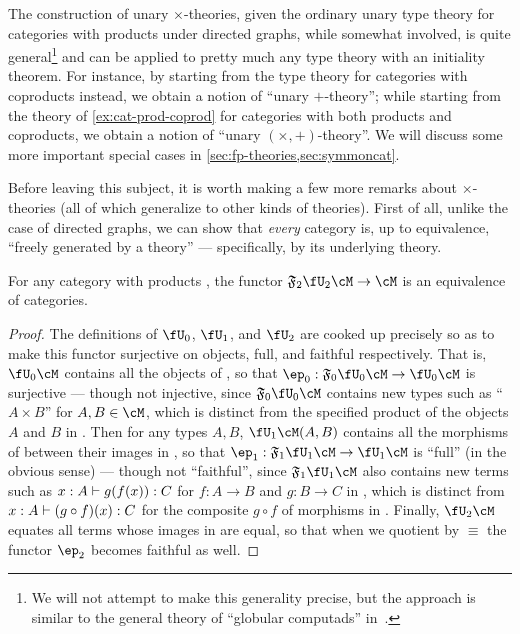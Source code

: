 The construction of unary $\times$-theories, given the ordinary unary type theory for categories with products under directed graphs, while somewhat involved, is quite general\footnote{We will not attempt to make this generality precise, but the approach is similar to the general theory of ``globular computads'' in~\cite{batanin:cptd-fin}.} and can be applied to pretty much any type theory with an initiality theorem.
For instance, by starting from the type theory for categories with coproducts instead, we obtain a notion of ``unary $+$-theory''; while starting from the theory of \cref{ex:cat-prod-coprod} for categories with both products and coproducts, we obtain a notion of ``unary $(\times,+)$-theory''.
We will discuss some more important special cases in \cref{sec:fp-theories,sec:symmoncat}.

Before leaving this subject, it is worth making a few more remarks about $\times$-theories (all of which generalize to other kinds of theories).
First of all, unlike the case of directed graphs, we can show that \emph{every} category is, up to equivalence, ``freely generated by a theory'' --- specifically, by its underlying theory.

\begin{thm}\label{thm:catprod-thy-esssurj}
  For any category with products \cM, the functor $\F2\fU_2\cM \to \cM$ is an equivalence of categories.
\end{thm}
\begin{proof}
  The definitions of $\fU_0$, $\fU_1$, and $\fU_2$ are cooked up precisely so as to make this functor surjective on objects, full, and faithful respectively.
  That is, $\fU_0\cM$ contains all the objects of \cM, so that $\ep_0:\F{0}\fU_0\cM\to \fU_0\cM$ is surjective --- though not injective, since $\F{0}\fU_0\cM$ contains new types such as ``$A\times B$'' for $A,B\in \cM$, which is distinct from the specified product of the objects $A$ and $B$ in \cM.
  Then for any types $A,B$, $\fU_1\cM(A,B)$ contains all the morphisms of \cM between their images in \cM, so that $\ep_1:\F{1}\fU_1\cM\to \fU_1\cM$ is ``full'' (in the obvious sense) --- though not ``faithful'', since $\F{1}\fU_1\cM$ also contains new terms such as $x:A\vdash g(f(x)):C$ for $f:A\to B$ and $g:B\to C$ in \cM, which is distinct from $x:A\vdash (g\circ f)(x):C$ for the composite $g\circ f$ of morphisms in \cM.
  Finally, $\fU_2\cM$ equates all terms whose images in \cM are equal, so that when we quotient by $\equiv$ the functor $\ep_2$ becomes faithful as well.
\end{proof}

